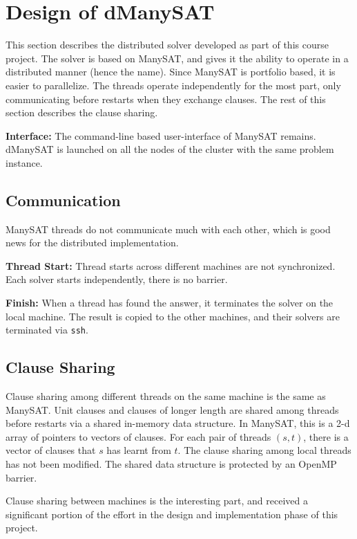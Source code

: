 \documentclass{article}
\begin{document}
\section{Design of dManySAT}

This section describes the distributed solver developed as part of
this course project. The solver is based on ManySAT, and gives it the
ability to operate in a distributed manner (hence the name). Since
ManySAT is portfolio based, it is easier to parallelize. The threads
operate independently for the most part, only communicating before
restarts when they exchange clauses. The rest of this section
describes the clause sharing.


\textbf{Interface: } The command-line based user-interface of ManySAT
remains. dManySAT is launched on all the nodes of the cluster with the
same problem instance. 

\subsection{Communication}

ManySAT threads do not communicate much with each other, which is good
news for the distributed implementation.

\textbf{Thread Start:} Thread starts across different machines are not
synchronized. Each solver starts independently, there is no barrier. 


\textbf{Finish: } When a thread has found the answer, it terminates
the solver on the local machine. The result is copied to the other
machines, and their solvers are terminated via \texttt{ssh}.

\subsection{Clause Sharing}

Clause sharing among different threads on the same machine is the same
as ManySAT. Unit clauses and clauses of longer length are shared among
threads before restarts via a shared in-memory data structure. In
ManySAT, this is a 2-d array  of pointers to vectors of clauses. For each
pair of threads $(s,t)$, there is a vector of clauses that $s$ has
learnt from $t$. The clause sharing among local threads has not been
modified. The shared data structure is protected by an OpenMP barrier. 


Clause sharing between machines is the interesting part, and received
a significant portion of the effort in the design and implementation
phase of this project. 
\end{document}
